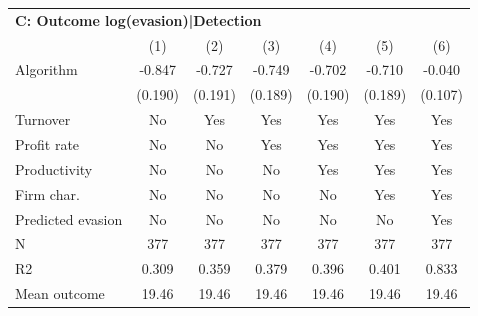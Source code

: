 \begin{tabular}{lcccccc}
\midrule \multicolumn{7}{l}{\textbf{C: Outcome log(evasion)|Detection}} \\ \multicolumn{1}{l}{} & (1) & (2) & (3) & (4) & (5) & (6) \\ \midrule
Algorithm   &      -0.847\sym{***}&      -0.727\sym{***}&      -0.749\sym{***}&      -0.702\sym{***}&      -0.710\sym{***}&      -0.040         \\
            &     (0.190)         &     (0.191)         &     (0.189)         &     (0.190)         &     (0.189)         &     (0.107)         \\
\midrule
Turnover    &          No         &         Yes         &         Yes         &         Yes         &         Yes         &         Yes         \\
Profit rate &          No         &          No         &         Yes         &         Yes         &         Yes         &         Yes         \\
Productivity&          No         &          No         &          No         &         Yes         &         Yes         &         Yes         \\
Firm char.  &          No         &          No         &          No         &          No         &         Yes         &         Yes         \\
Predicted evasion&          No         &          No         &          No         &          No         &          No         &         Yes         \\
N           &         377         &         377         &         377         &         377         &         377         &         377         \\
R2          &       0.309         &       0.359         &       0.379         &       0.396         &       0.401         &       0.833         \\
Mean outcome&       19.46         &       19.46         &       19.46         &       19.46         &       19.46         &       19.46         \\
\bottomrule \end{tabular}
